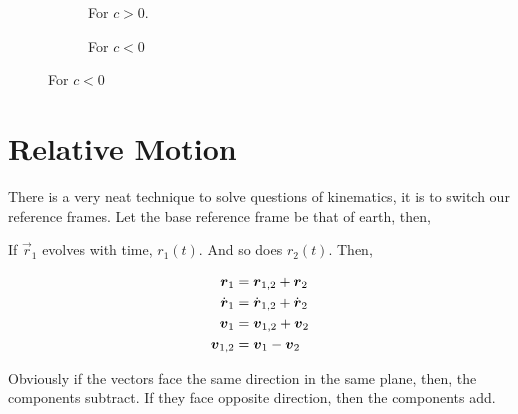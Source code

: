 \begin{figure}[H]
    \centering
    \begin{subfigure}{0.5\textwidth}
        \centering
        \caption{For \(c > 0\). }
    \end{subfigure}%
    \begin{subfigure}{0.5\textwidth}
        \centering
        \caption{For \(c < 0\)}
    \end{subfigure}%
\end{figure}

\section{Relative Motion}

There is a very neat technique to solve questions of kinematics, it is to switch our 
reference frames. Let the base reference frame be that of earth, then,

\begin{figure}
    [H]
    \centering
\end{figure}

If \(\vec{r}_1\) evolves with time, \(r_1(t)\). And so does \(r_2(t)\). Then,

\begin{align*}
    \boldsymbol{r}_1 &= \boldsymbol{r}_{1,2} + \boldsymbol{r}_2 \\
    \dot{\boldsymbol{r}}_1 &= \dot{\boldsymbol{r}}_{1,2} + \dot{\boldsymbol{r}}_2 \\
    \boldsymbol{v}_1 &= \boldsymbol{v}_{1,2} + \boldsymbol{v}_{2}\\
    \boldsymbol{v}_{1,2} &= \boldsymbol{v}_1 - \boldsymbol{v}_{2}
\end{align*}

Obviously if the vectors face the same direction in the same plane, then, the components subtract. If they face
opposite direction, then the components add. 


